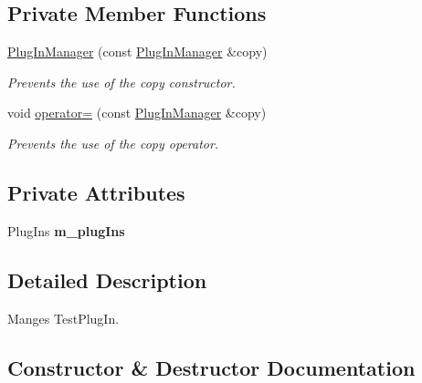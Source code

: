 \subsection*{Private Member Functions}
\begin{DoxyCompactItemize}
\item 
\hyperlink{class_plug_in_manager_ab33846008e25d243896844cbdfcc5706}{Plug\+In\+Manager} (const \hyperlink{class_plug_in_manager}{Plug\+In\+Manager} \&copy)\hypertarget{class_plug_in_manager_ab33846008e25d243896844cbdfcc5706}{}\label{class_plug_in_manager_ab33846008e25d243896844cbdfcc5706}

\begin{DoxyCompactList}\small\item\em Prevents the use of the copy constructor. \end{DoxyCompactList}\item 
void \hyperlink{class_plug_in_manager_aa9a781046d8381a1f6c32b132655f961}{operator=} (const \hyperlink{class_plug_in_manager}{Plug\+In\+Manager} \&copy)\hypertarget{class_plug_in_manager_aa9a781046d8381a1f6c32b132655f961}{}\label{class_plug_in_manager_aa9a781046d8381a1f6c32b132655f961}

\begin{DoxyCompactList}\small\item\em Prevents the use of the copy operator. \end{DoxyCompactList}\end{DoxyCompactItemize}
\subsection*{Private Attributes}
\begin{DoxyCompactItemize}
\item 
Plug\+Ins {\bfseries m\+\_\+plug\+Ins}\hypertarget{class_plug_in_manager_a5a21fd6bdd4c648979da15d60f784de6}{}\label{class_plug_in_manager_a5a21fd6bdd4c648979da15d60f784de6}

\end{DoxyCompactItemize}


\subsection{Detailed Description}
Manges Test\+Plug\+In. 

\subsection{Constructor \& Destructor Documentation}
